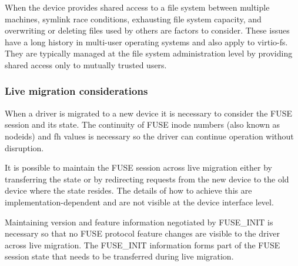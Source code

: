 When the device provides shared access to a file system between multiple
machines, symlink race conditions, exhausting file system capacity, and
overwriting or deleting files used by others are factors to consider.  These
issues have a long history in multi-user operating systems and also apply to
virtio-fs.  They are typically managed at the file system administration level
by providing shared access only to mutually trusted users.

\subsubsection{Live migration considerations}\label{sec:Device Types / File System Device / Live Migration Considerations}

When a driver is migrated to a new device it is necessary to consider the FUSE
session and its state.  The continuity of FUSE inode numbers (also known as
nodeids) and fh values is necessary so the driver can continue operation
without disruption.

It is possible to maintain the FUSE session across live migration either by
transferring the state or by redirecting requests from the new device to the
old device where the state resides.  The details of how to achieve this are
implementation-dependent and are not visible at the device interface level.

Maintaining version and feature information negotiated by FUSE\_INIT is
necessary so that no FUSE protocol feature changes are visible to the driver
across live migration.  The FUSE\_INIT information forms part of the FUSE
session state that needs to be transferred during live migration.
